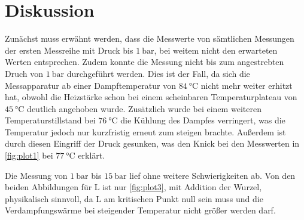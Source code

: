 \section{Diskussion}
\label{sec:Diskussion}
Zunächst muss erwähnt werden, dass die Messwerte von sämtlichen Messungen der ersten Messreihe mit Druck bis $\SI{1}{\bar}$, bei weitem nicht den erwarteten Werten entsprechen.
Zudem konnte die Messung nicht bis zum angestrebten Druch von $\SI{1}{\bar}$ durchgeführt werden. Dies ist der Fall, da sich die Messapparatur ab einer Dampftemperatur von
$\SI{84}{\celsius}$ nicht mehr weiter erhitzt hat, obwohl die Heizstärke schon bei einem scheinbaren Temperaturplateau von $\SI{45}{\celsius}$ deutlich angehoben wurde.
Zusätzlich wurde bei einem weiteren Temperaturstillstand bei $\SI{76}{\celsius}$ die Kühlung des Dampfes verringert, was die Temperatur jedoch nur kurzfristig erneut
zum steigen brachte. Außerdem ist durch diesen Eingriff der Druck gesunken, was den Knick bei den Messwerten in \autoref{fig:plot1} bei $\SI{77}{\celsius}$ erklärt.

\noindent
Die Messung von $\SI{1}{\bar}$ bis $\SI{15}{\bar}$ lief ohne weitere Schwierigkeiten ab. Von den beiden Abbildungen für L ist nur \autoref{fig:plot3}, mit Addition der
Wurzel, physikalisch sinnvoll, da L am kritischen Punkt null sein muss und die Verdampfungswärme bei steigender Temperatur nicht größer werden darf.